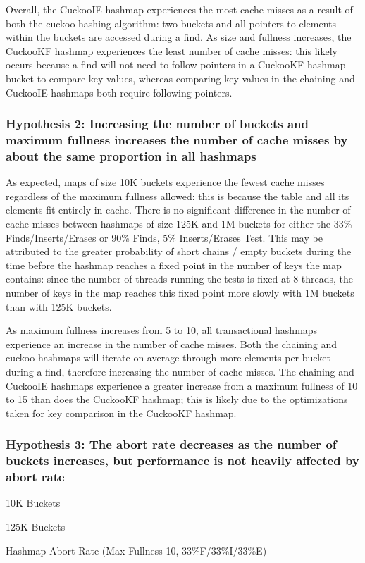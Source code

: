 Overall, the CuckooIE hashmap experiences the most cache misses as a result of both the cuckoo hashing algorithm: two buckets and all pointers to elements within the buckets are accessed during a find. As size and fullness increases, the CuckooKF hashmap experiences the least number of cache misses: this likely occurs because a find will not need to follow pointers in a CuckooKF hashmap bucket to compare key values, whereas comparing key values in the chaining and CuckooIE hashmaps both require following pointers.

\subsubsection{Hypothesis 2: Increasing the number of buckets and maximum fullness increases the number of cache misses by about the same proportion in all hashmaps}

As expected, maps of size 10K buckets experience the fewest cache misses regardless of the maximum fullness allowed: this is because the table and all its elements fit entirely in cache. There is no significant difference in the number of cache misses between hashmaps of size 125K and 1M buckets for either the 33\% Finds/Inserts/Erases  or 90\% Finds, 5\% Inserts/Erases Test. This may be attributed to the greater probability of short chains / empty buckets during the time before the hashmap reaches a fixed point in the number of keys the map contains: since the number of threads running the tests is fixed at 8 threads, the number of keys in the map reaches this fixed point more slowly with 1M buckets than with 125K buckets.

As maximum fullness increases from 5 to 10, all transactional hashmaps experience an increase in the number of cache misses. Both the chaining and cuckoo hashmaps will iterate on average through more elements per bucket during a find, therefore increasing the number of cache misses. The chaining and CuckooIE hashmaps experience a greater increase from a maximum fullness of 10 to 15 than does the CuckooKF hashmap; this is likely due to the optimizations taken for key comparison in the CuckooKF hashmap.

\subsubsection{Hypothesis 3: The abort rate decreases as the number of buckets increases, but performance is not heavily affected by abort rate}

    \begin{table}[t]
    \centering
        \begin{minipage}{0.45\textwidth}
        \centering
        
        \caption*{10K Buckets}
        \end{minipage}
        \begin{minipage}{0.45\textwidth}
        \centering
        
        \caption*{125K Buckets}
        \end{minipage}
        \caption{Hashmap Abort Rate (Max Fullness 10, 33\%F/33\%I/33\%E)}
    \end{table}


